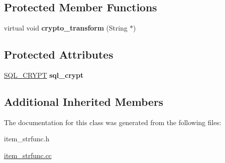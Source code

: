 \subsection*{Protected Member Functions}
\begin{DoxyCompactItemize}
\item 
\mbox{\label{classItem__func__encode_a5311553f9f8d530c535e303124d799fd}} 
virtual void {\bfseries crypto\+\_\+transform} (String $\ast$)
\end{DoxyCompactItemize}
\subsection*{Protected Attributes}
\begin{DoxyCompactItemize}
\item 
\mbox{\label{classItem__func__encode_a9916c948b48bf0031c4b2a45fd6945f3}} 
\mbox{\hyperlink{classSQL__CRYPT}{S\+Q\+L\+\_\+\+C\+R\+Y\+PT}} {\bfseries sql\+\_\+crypt}
\end{DoxyCompactItemize}
\subsection*{Additional Inherited Members}


The documentation for this class was generated from the following files\+:\begin{DoxyCompactItemize}
\item 
item\+\_\+strfunc.\+h\item 
\mbox{\hyperlink{item__strfunc_8cc}{item\+\_\+strfunc.\+cc}}\end{DoxyCompactItemize}
